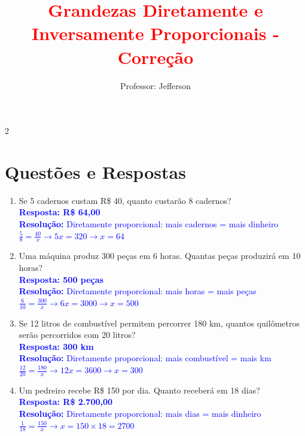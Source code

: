 \documentclass[11pt]{article}
\title{\textbf{\textcolor{red}{Grandezas Diretamente e Inversamente Proporcionais - Correção}}}
\author{Professor: Jefferson}
\date{}
\begin{document}
\maketitle
\vspace{-0.5cm}

\begin{multicols}{2}

\section*{Questões e Respostas}

\begin{enumerate}[leftmargin=*, itemsep=2pt]

\item Se 5 cadernos custam R\$ 40, quanto custarão 8 cadernos? \\
\textcolor{blue}{\textbf{Resposta: R\$ 64,00}} \\
\textcolor{blue}{\textbf{Resolução:} Diretamente proporcional: mais cadernos = mais dinheiro} \\
\textcolor{blue}{$\frac{5}{8} = \frac{40}{x} \rightarrow 5x = 320 \rightarrow x = 64$}

\item Uma máquina produz 300 peças em 6 horas. Quantas peças produzirá em 10 horas? \\
\textcolor{blue}{\textbf{Resposta: 500 peças}} \\
\textcolor{blue}{\textbf{Resolução:} Diretamente proporcional: mais horas = mais peças} \\
\textcolor{blue}{$\frac{6}{10} = \frac{300}{x} \rightarrow 6x = 3000 \rightarrow x = 500$}

\item Se 12 litros de combustível permitem percorrer 180 km, quantos quilômetros serão percorridos com 20 litros? \\
\textcolor{blue}{\textbf{Resposta: 300 km}} \\
\textcolor{blue}{\textbf{Resolução:} Diretamente proporcional: mais combustível = mais km} \\
\textcolor{blue}{$\frac{12}{20} = \frac{180}{x} \rightarrow 12x = 3600 \rightarrow x = 300$}

\item Um pedreiro recebe R\$ 150 por dia. Quanto receberá em 18 dias? \\
\textcolor{blue}{\textbf{Resposta: R\$ 2.700,00}} \\
\textcolor{blue}{\textbf{Resolução:} Diretamente proporcional: mais dias = mais dinheiro} \\
\textcolor{blue}{$\frac{1}{18} = \frac{150}{x} \rightarrow x = 150 \times 18 = 2700$}


\end{enumerate}
\end{multicols}
\end{document}
